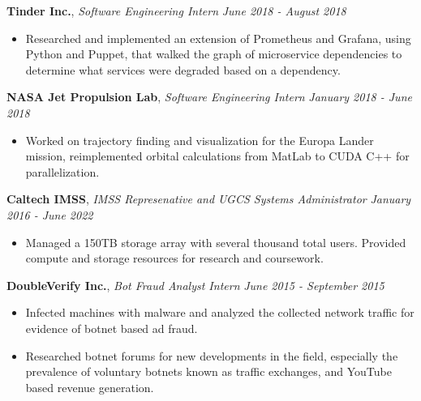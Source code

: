 \documentclass[8pt]{article}
\newenvironment{changemargin}[2]{%
  \begin{list}{}{%
    \setlength{\topsep}{0pt}%
    \setlength{\leftmargin}{#1}%
    \setlength{\rightmargin}{#2}%
    \setlength{\listparindent}{\parindent}%
    \setlength{\itemindent}{\parindent}%
    \setlength{\parsep}{\parskip}%
  }%
  \item[]}{\end{list}
}
\newenvironment{body} {
	\vspace*{-16pt}
	\begin{changemargin}{-0.25in}{-0.5in}
  }	
	{\end{changemargin}
}
\begin{document}
\begin{body}
	\textbf{Tinder Inc.}, \emph{Software Engineering Intern} \hfill \emph{June 2018 - August 2018}\\
	\vspace*{-3pt}
	\begin{itemize} \itemsep -0pt %
		\item Researched and implemented an extension of Prometheus and Grafana, using Python and Puppet, that walked the graph of
		microservice dependencies to determine what services were degraded based on a dependency.
	\end{itemize}
	\vspace*{-4pt}

	\textbf{NASA Jet Propulsion Lab}, \emph{Software Engineering Intern} \hfill \emph{January 2018 - June 2018}\\
	\vspace*{-3pt}
	\begin{itemize} \itemsep -0pt %
		\item Worked on trajectory finding and visualization for the Europa Lander mission, reimplemented orbital calculations from MatLab to CUDA C++ for parallelization.
	\end{itemize}
	\vspace*{-4pt}

	\textbf{Caltech IMSS}, \emph{IMSS Represenative and UGCS Systems Administrator} \hfill \emph{January 2016 - June 2022}\\
	\vspace*{-4pt}
	\begin{itemize} \itemsep -0pt %
		\item Managed a 150TB storage array with several thousand total users. Provided compute and storage resources for research and coursework.
	\end{itemize}
	\vspace*{-4pt}

	\textbf{DoubleVerify Inc.}, \emph{Bot Fraud Analyst Intern} \hfill \emph{June 2015 - September 2015}\\
	\vspace*{-4pt}
	\begin{itemize} \itemsep -0pt %
		\item Infected machines with malware and analyzed the collected network traffic for evidence of botnet based ad fraud.
		\item Researched botnet forums for new developments in the field, especially the prevalence of voluntary botnets known as traffic exchanges, and YouTube based revenue generation.
	\end{itemize}
	\vspace*{-4pt}


\end{body}
\end{document}
